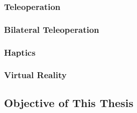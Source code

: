 \subsubsection{Teleoperation}

\pagebreak[1]

\subsubsection{Bilateral Teleoperation}

\pagebreak[1]
\subsubsection{Haptics}
\pagebreak[1]
\subsubsection{Virtual Reality}
\pagebreak[1]



\subsection{Objective of This Thesis}
\pagebreak[1]


